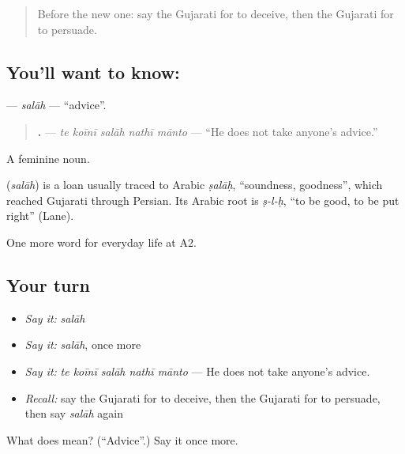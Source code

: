 \label{lesson:GU-C268-salah}



\begin{quote}
Before the new one: say the Gujarati for to deceive, then the Gujarati for to persuade.
\end{quote}

\subsection*{You'll want to know: }
\textbf{} — \emph{salāh} — \textquotedblleft{}advice\textquotedblright{}.

\begin{quote}
\textbf{    .} — \emph{te koīnī salāh nathī mānto} — \textquotedblleft{}He does not take anyone's advice.\textquotedblright{}
\end{quote}

A feminine noun.

\begin{cousinweb}
\textbf{} (\emph{salāh}) is a loan usually traced to Arabic \emph{ṣalāḥ}, \textquotedblleft{}soundness, goodness\textquotedblright{}, which reached Gujarati through Persian. Its Arabic root is \emph{ṣ-l-ḥ}, \textquotedblleft{}to be good, to be put right\textquotedblright{} (Lane).
\end{cousinweb}

\begin{grammarlens}[title={What you've built}]
One more word for everyday life at A2.
\end{grammarlens}

\subsection*{Your turn}
\begin{itemize}
\raggedright
  \item \emph{Say it:} \emph{salāh}
  \item \emph{Say it:} \emph{salāh}, once more
  \item \emph{Say it:} \emph{te koīnī salāh nathī mānto} — He does not take anyone's advice.
  \item \emph{Recall:} say the Gujarati for to deceive, then the Gujarati for to persuade, then say \emph{salāh} again
\end{itemize}

\begin{tcolorbox}[breakable,colback=teal!4,colframe=teal!35!black,title={Before you move on}]
What does  mean? (\textquotedblleft{}Advice\textquotedblright{}.) Say it once more.
\end{tcolorbox}
